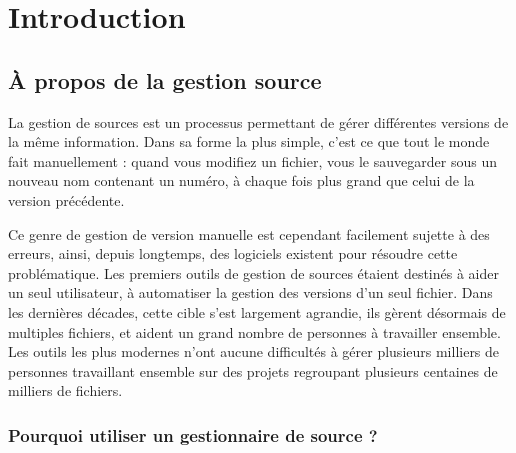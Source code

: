\chapter{Introduction}
\label{chap:intro}

\section{À propos de la gestion source}

La gestion de sources est un processus permettant de gérer différentes
versions de la même information. Dans sa forme la plus simple, c'est
ce que tout le monde fait manuellement : quand vous modifiez
un fichier, vous le sauvegarder sous un nouveau nom contenant un numéro,
à chaque fois plus grand que celui de la version précédente.

Ce genre de gestion de version manuelle est cependant facilement sujette 
à des erreurs, ainsi, depuis longtemps, des logiciels existent pour
résoudre cette problématique. Les premiers outils de gestion de sources
étaient destinés à aider un seul utilisateur, à automatiser la gestion
des versions d'un seul fichier. Dans les dernières décades, cette cible 
s'est largement agrandie, ils gèrent désormais de multiples fichiers, et
aident un grand nombre de personnes à travailler ensemble. Les outils les
plus modernes n'ont aucune difficultés à gérer plusieurs milliers de 
personnes travaillant ensemble sur des projets regroupant plusieurs 
centaines de milliers de fichiers.

\subsection{Pourquoi utiliser un gestionnaire de source ?}

